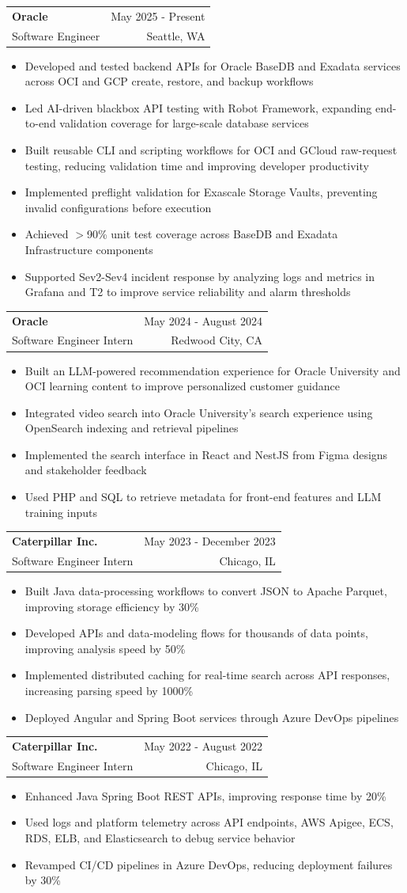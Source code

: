 \documentclass[letterpaper,11pt]{article}
\makeatletter
\newcommand{\resumeItem}[1]{
  \item\small{
    {#1 \vspace{-2pt}}
  }
}
\newcommand{\resumeSubheading}[4]{
  \vspace{-2pt}\item
    \begin{tabular*}{0.97\textwidth}[t]{l@{\extracolsep{\fill}}r}
      \textbf{#1} & #2 \\
      {\small#3} & {\small #4} \\
    \end{tabular*}\vspace{-7pt}
}
\newcommand{\resumeItemListStart}{\begin{itemize}}
\newcommand{\resumeItemListEnd}{\end{itemize}\vspace{-5pt}}
\makeatother
\begin{document}
    \resumeSubheading
  {Oracle}{May 2025 - Present}
  {Software Engineer}{Seattle, WA}
  \resumeItemListStart
    \resumeItem{Developed and tested backend APIs for Oracle BaseDB and Exadata services across OCI and GCP create, restore, and backup workflows}
    \resumeItem{Led AI-driven blackbox API testing with Robot Framework, expanding end-to-end validation coverage for large-scale database services}
    \resumeItem{Built reusable CLI and scripting workflows for OCI and GCloud raw-request testing, reducing validation time and improving developer productivity}
    \resumeItem{Implemented preflight validation for Exascale Storage Vaults, preventing invalid configurations before execution}
    \resumeItem{Achieved $>$90\% unit test coverage across BaseDB and Exadata Infrastructure components}
    \resumeItem{Supported Sev2-Sev4 incident response by analyzing logs and metrics in Grafana and T2 to improve service reliability and alarm thresholds}
  \resumeItemListEnd

    \resumeSubheading
      {Oracle}{May 2024 - August 2024}
      {Software Engineer Intern}{Redwood City, CA}
      \resumeItemListStart
        \resumeItem{Built an LLM-powered recommendation experience for Oracle University and OCI learning content to improve personalized customer guidance}
        \resumeItem{Integrated video search into Oracle University's search experience using OpenSearch indexing and retrieval pipelines}
        \resumeItem{Implemented the search interface in React and NestJS from Figma designs and stakeholder feedback}
        \resumeItem{Used PHP and SQL to retrieve metadata for front-end features and LLM training inputs}
      \resumeItemListEnd

    \resumeSubheading
      {Caterpillar Inc.}{May 2023 - December 2023}
      {Software Engineer Intern}{Chicago, IL}
      \resumeItemListStart
        \resumeItem{Built Java data-processing workflows to convert JSON to Apache Parquet, improving storage efficiency by 30\%}
        \resumeItem{Developed APIs and data-modeling flows for thousands of data points, improving analysis speed by 50\%}
        \resumeItem{Implemented distributed caching for real-time search across API responses, increasing parsing speed by 1000\%}
        \resumeItem{Deployed Angular and Spring Boot services through Azure DevOps pipelines}
      \resumeItemListEnd

    \resumeSubheading
      {Caterpillar Inc.}{May 2022 - August 2022}
      {Software Engineer Intern}{Chicago, IL}
      \resumeItemListStart
        \resumeItem{Enhanced Java Spring Boot REST APIs, improving response time by 20\%}
        \resumeItem{Used logs and platform telemetry across API endpoints, AWS Apigee, ECS, RDS, ELB, and Elasticsearch to debug service behavior}
        \resumeItem{Revamped CI/CD pipelines in Azure DevOps, reducing deployment failures by 30\%}
    \resumeItemListEnd
\end{document}
